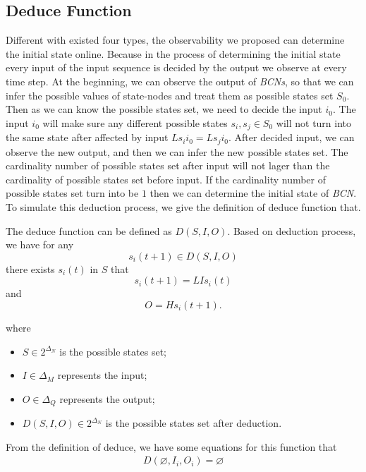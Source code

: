 \subsection{Deduce Function}
Different with existed four types, the observability we proposed can determine the initial state online. Because in the process of determining the initial state every input of the input sequence is decided by the output we observe at every time step. At the beginning, we can observe the output of {\em BCNs}, so that we can infer the possible values of state-nodes and treat them as possible states set $S_0$. Then as we can know the possible states set, we need to decide the input $i_0$. The input $i_0$ will make sure any different possible states $s_i, s_j \in S_0$ will not turn into the same state after affected by input $Ls_i i_0=Ls_j i_0$. After decided input, we can observe the new output, and then we can infer the new possible states set. The cardinality number of possible states set after input will not lager than the cardinality of possible states set before input. If the cardinality number of possible states set turn into be $1$ then we can determine the initial state of {\em BCN}. To simulate this deduction process, we give the definition of deduce function that.
\begin{definition} The deduce function can be defined as $D\left(S, I, O\right)$. Based on deduction process, we have for any \[s_i(t+1)\in D\left(S, I, O\right)\] there exists $s_i(t)$ in $S$ that \[s_i(t+1)=LIs_i(t)\] and \[O=Hs_i(t+1).\]
\end{definition}
where   
\begin{itemize}
  \item $S\in 2^{\Delta_N}$ is the possible states set;
  \item $I\in\Delta_M$ represents the input;
  \item $O\in\Delta_Q$ represents the output; 
  \item $D\left(S, I, O\right)\in 2^{\Delta_N}$ is the possible states set after deduction.
\end{itemize} 
 
 From the definition of deduce, we have some equations for this function that
\begin{equation}
\begin{split}
D\left(\varnothing,I_i,O_i\right)=\varnothing\\
\end{split}
\label{equ:7}
\end{equation}

